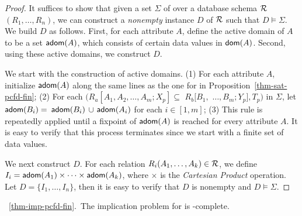 \begin{proof} It suffices to show that given a set $\Sigma$ of \pCINDs over a
database schema $\cal R$$(R_1,\ldots,R_n)$, we can construct a {\em
nonempty} instance $D$ of $\cal R$ such that $D \models \Sigma$. We
build $D$ as follows. First, for each attribute $A$, define the
active domain of $A$ to be a set ${\mathsf{adom}}(A)$, which consists of
certain data values in $\protect\mathsf{dom}(A)$. Second, using these active
domains, we construct $D$.

We start with the construction of active domains. (1) For each
attribute $A$, initialize ${\mathsf{adom}}(A)$ along the same lines as the one
for \pCFDs in Proposition~\ref{thm-sat-pcfd-fin}; (2) For each
\pCIND $(R_a[A_1,A_2,\ldots,A_m;X_p] \subseteq$ $R_b[B_1,$
$\ldots,B_m;Y_p], T_p)$ in $\Sigma$, let ${\mathsf{adom}}(B_i)=$ ${\mathsf{adom}}(B_i)$
$\cup$ ${\mathsf{adom}}(A_i)$ for each $i\in [1,m]$; (3) This rule is
repeatedly applied until a fixpoint of ${\mathsf{adom}}(A)$ is reached for
every attribute $A$. It is easy to verify that this process
terminates since we start with a finite set of data values.

We next construct $D$. For each relation $R_i(A_1,\dots,A_k) \in
{\cal R}$, we define $I_i = {\mathsf{adom}}(A_1)\times \dots \times
{\ensuremath {\mathsf{adom}}}(A_k)$, where $\times$ is the {\em Cartesian Product}
operation. Let $D = \{I_1,\dots,I_n\}$, then it is easy to verify
that $D$ is nonempty and $D \models \Sigma$. \eop
\end{proof}



\vspace{2ex} \noindent{}~\ref{thm-imp-pcfd-fin}.~The
implication problem for \pCFDs is \coNP-complete. \eop

